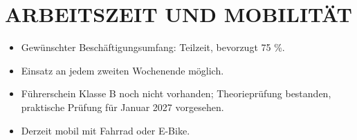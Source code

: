 \documentclass[11pt,a4paper]{article}
\newcommand{\cvsection}[1]{\section*{#1}}
\begin{document}
\cvsection{ARBEITSZEIT UND MOBILITÄT}
\begin{itemize}
\item Gewünschter Beschäftigungsumfang: Teilzeit, bevorzugt 75 \%.
\item Einsatz an jedem zweiten Wochenende möglich.
\item Führerschein Klasse B noch nicht vorhanden; Theorieprüfung bestanden, praktische Prüfung für Januar 2027 vorgesehen.
\item Derzeit mobil mit Fahrrad oder E-Bike.
\end{itemize}
\end{document}
